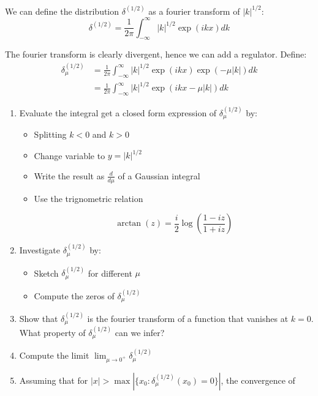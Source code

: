 \begin{mystexercise}\label{delta_1over2}We can define the distribution $\delta^{(1/2)}$  as a fourier transform of $|k|^{1/2}$:
\begin{equation}
\delta^{(1/2)}=\frac{1}{2\pi}\int_{-\infty}^{\infty} |k|^{1/2}\exp(ikx)dk
\end{equation}

The fourier transform is clearly divergent, hence we can add a regulator. Define:
\begin{equation}
\begin{aligned}
\delta^{(1/2)}_{\mu}&=\frac{1}{2\pi}\int_{-\infty}^{\infty} |k|^{1/2}\exp(ikx)\exp(-\mu|k|)dk \\
&= \frac{1}{2\pi}\int_{-\infty}^{\infty} |k|^{1/2}\exp(ikx-\mu|k|)dk
\end{aligned}
\end{equation}

\begin{enumerate}
\item Evaluate the integral get a closed form expression of $\delta_{\mu}^{(1/2)}$ by:

\begin{itemize}
\item Splitting $k<0$ and $k>0$
\item Change variable to $y=|k|^{1/2}$
\item Write the result as $\frac{d}{d\mu}$ of a Gaussian integral
\item Use the trignometric relation

\begin{equation}
\arctan(z)=\frac{i}{2}\log\left(\frac{1-iz}{1+iz}\right)
\end{equation}
\end{itemize}


\item Investigate $\delta^{(1/2)}_{\mu}$ by:

\begin{itemize}
\item Sketch $\delta^{(1/2)}_{\mu}$ for different $\mu$
\item Compute the zeros of $\delta^{(1/2)}_{\mu}$
\end{itemize}


\item Show that $\delta^{(1/2)}_{\mu}$ is the fourier transform of a function that vanishes at $k=0$. What property of $\delta^{(1/2)}_{\mu}$ can we infer?
\item Compute the limit
$\lim_{\mu \to 0^+}\delta^{(1/2)}_{\mu}$
\item Assuming that for $|x|>\max|\{x_0: \delta^{(1/2)}_{\mu}(x_0)=0\}|$, the convergence of


\end{enumerate}
\end{mystexercise}
